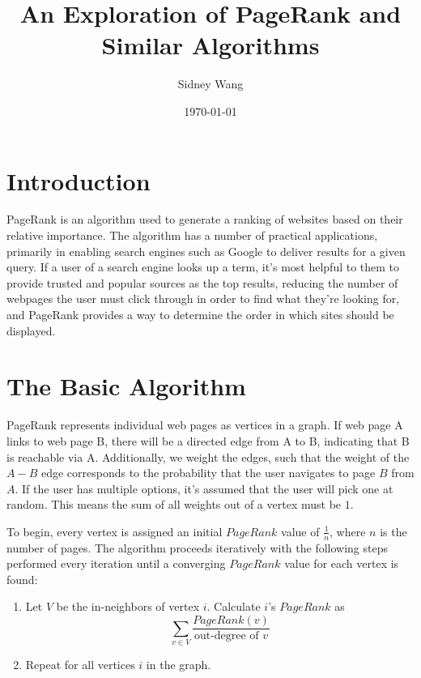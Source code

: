 \documentclass{article}
\title{An Exploration of PageRank and Similar Algorithms}
\author{Sidney Wang}
\date{\today}
\begin{document}
\maketitle

\section{Introduction}

PageRank is an algorithm used to generate a ranking of websites based on their relative importance. The algorithm has a number of practical applications, primarily in enabling search engines such as Google to deliver results for a given query. If a user of a search engine looks up a term, it's most helpful to them to provide trusted and popular sources as the top results, reducing the number of webpages the user must click through in order to find what they're looking for, and PageRank provides a way to determine the order in which sites should be displayed.

\section{The Basic Algorithm}

PageRank represents individual web pages as vertices in a graph. If web page A links to web page B, there will be a directed edge from A to B, indicating that B is reachable via A. Additionally, we weight the edges, such that the weight of the $A-B$ edge corresponds to the probability that the user navigates to page $B$ from $A$. If the user has multiple options, it's assumed that the user will pick one at random. This means the sum of all weights out of a vertex must be $1$.

To begin, every vertex is assigned an initial $PageRank$ value of $\frac{1}{n}$, where $n$ is the number of pages. The algorithm proceeds iteratively with the following steps performed every iteration until a converging $PageRank$ value for each vertex is found:

\begin{enumerate}
    \item Let $V$ be the in-neighbors of vertex $i$. Calculate $i$'s $PageRank$ as 
    \begin{equation}
        \sum\limits_{v \in V} \frac{PageRank(v)}{\text{out-degree of } v}
    \end{equation}
    \item Repeat for all vertices $i$ in the graph.
\end{enumerate}
\end{document}

